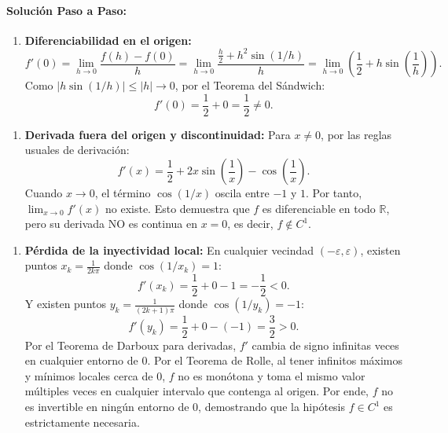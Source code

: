 \documentclass[11pt,a4paper]{article}
\begin{document}
\paragraph{Solución Paso a Paso:}\par
\begin{enumerate}[label=\textbf{\arabic*.}]
\item \textbf{Diferenciabilidad en el origen:}
\begin{equation*}
f'(0) = \lim_{h \to 0} \frac{f(h) - f(0)}{h} = \lim_{h \to 0} \frac{\frac{h}{2} + h^2 \sin(1/h)}{h} = \lim_{h \to 0} \left(\frac{1}{2} + h \sin\left(\frac{1}{h}\right)\right).
\end{equation*}
Como $|h\sin(1/h)| \le |h| \to 0$, por el Teorema del Sándwich:
\begin{equation*}
f'(0) = \frac{1}{2} + 0 = \frac{1}{2} \neq 0.
\end{equation*}
\end{enumerate}

\begin{enumerate}[label=\textbf{\arabic*.}]
\item \textbf{Derivada fuera del origen y discontinuidad:}
Para $x \neq 0$, por las reglas usuales de derivación:
\begin{equation*}
f'(x) = \frac{1}{2} + 2x\sin\left(\frac{1}{x}\right) - \cos\left(\frac{1}{x}\right).
\end{equation*}
Cuando $x \to 0$, el término $\cos(1/x)$ oscila entre $-1$ y $1$.
Por tanto, $\lim_{x \to 0} f'(x)$ no existe. Esto demuestra que $f$ es diferenciable en todo $\mathbb{R}$, pero su derivada NO es continua en $x=0$, es decir, $f \notin C^1$.
\end{enumerate}

\begin{enumerate}[label=\textbf{\arabic*.}]
\item \textbf{Pérdida de la inyectividad local:}
En cualquier vecindad $(-\varepsilon, \varepsilon)$, existen puntos $x_k = \frac{1}{2k\pi}$ donde $\cos(1/x_k) = 1$:
\begin{equation*}
f'(x_k) = \frac{1}{2} + 0 - 1 = -\frac{1}{2} < 0.
\end{equation*}
Y existen puntos $y_k = \frac{1}{(2k+1)\pi}$ donde $\cos(1/y_k) = -1$:
\begin{equation*}
f'(y_k) = \frac{1}{2} + 0 - (-1) = \frac{3}{2} > 0.
\end{equation*}
Por el Teorema de Darboux para derivadas, $f'$ cambia de signo infinitas veces en cualquier entorno de $0$.
Por el Teorema de Rolle, al tener infinitos máximos y mínimos locales cerca de $0$, $f$ no es monótona y toma el mismo valor múltiples veces en cualquier intervalo que contenga al origen.
Por ende, $f$ no es invertible en ningún entorno de $0$, demostrando que la hipótesis $f \in C^1$ es estrictamente necesaria.
\end{enumerate}
\end{document}

